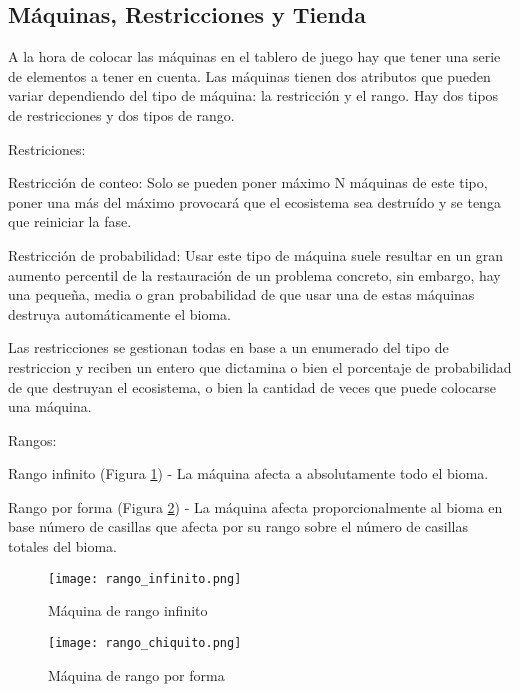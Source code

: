 \subsection{Máquinas, Restricciones y Tienda}

A la hora de colocar las máquinas en el tablero de juego hay que tener una serie de elementos a tener en cuenta. Las máquinas tienen dos atributos que pueden variar dependiendo del tipo de máquina: la restricción y el rango. Hay dos tipos de restricciones y dos tipos de rango.

Restriciones:
\begin{compactitem}
    \item Restricción de conteo: Solo se pueden poner máximo N máquinas de este tipo, poner una más del máximo provocará que el ecosistema sea destruído y se tenga que reiniciar la fase.
    \item Restricción de probabilidad: Usar este tipo de máquina suele resultar en un gran aumento percentil de la restauración de un problema concreto, sin embargo, hay una pequeña, media o gran probabilidad de que usar una de estas máquinas destruya automáticamente el bioma.
\end{compactitem}

Las restricciones se gestionan todas en base a un enumerado del tipo de restriccion y reciben un entero que dictamina o bien el porcentaje de probabilidad de que destruyan el ecosistema, o bien la cantidad de veces que puede colocarse una máquina.

Rangos:
\begin{compactitem}
    \item Rango infinito (Figura \ref{fig:rango_inf}) - La máquina afecta a absolutamente todo el bioma.
    \item Rango por forma (Figura \ref{fig:rango_form}) - La máquina afecta proporcionalmente al bioma en base número de casillas que afecta por su rango sobre el número de casillas totales del bioma.
\end{compactitem}

\begin{figure}[H]
    \centering
      \texttt{[image: rango\_infinito.png]}
    \caption{Máquina de rango infinito}
    \label{fig:rango_inf}
  \end{figure}

  \begin{figure}[H]
    \centering
      \texttt{[image: rango\_chiquito.png]}
    \caption{Máquina de rango por forma}
    \label{fig:rango_form}
  \end{figure}

